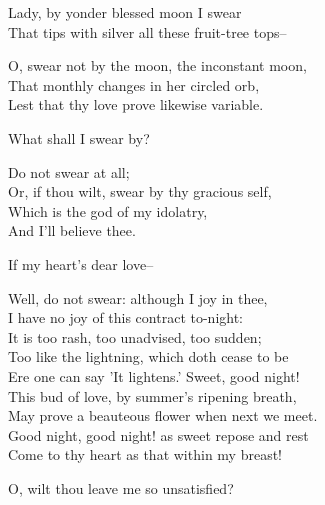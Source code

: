 \begin{speech}
Lady, by yonder blessed moon I swear \\
That tips with silver all these fruit-tree tops-- \\
\end{speech}
\begin{speech}
O, swear not by the moon, the inconstant moon, \\

That monthly changes in her circled orb, \\
Lest that thy love prove likewise variable. \\
\end{speech}
\begin{speech}
What shall I swear by? \\
\end{speech}
\begin{speech}
Do not swear at all; \\
Or, if thou wilt, swear by thy gracious self, \\
Which is the god of my idolatry, \\
And I'll believe thee. \\
\end{speech}
\begin{speech}
If my heart's dear love-- \\
\end{speech}
\begin{speech}
Well, do not swear: although I joy in thee, \\
I have no joy of this contract to-night: \\
It is too rash, too unadvised, too sudden; \\
Too like the lightning, which doth cease to be \\
Ere one can say 'It lightens.' Sweet, good night! \\
This bud of love, by   summer's ripening breath, \\
May prove a beauteous flower when next we meet. \\
Good night, good night! as sweet repose and rest \\
Come to thy heart as that within my breast! \\
\end{speech}
\begin{speech}
O, wilt thou leave me so unsatisfied? \\
\end{speech}
